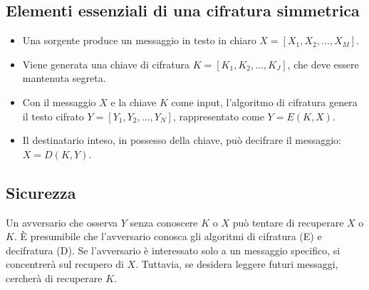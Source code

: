 \subsection{Elementi essenziali di una cifratura simmetrica}
\begin{itemize}
    \item Una sorgente produce un messaggio in testo in chiaro $X = [X_1, X_2, \ldots, X_M]$.
    \item Viene generata una chiave di cifratura $K = [K_1, K_2, \ldots, K_J]$, che deve essere mantenuta segreta.
    \item Con il messaggio $X$ e la chiave $K$ come input, l'algoritmo di cifratura genera 
    il testo cifrato $Y = [Y_1, Y_2, \ldots, Y_N]$, rappresentato come $Y = E(K, X)$.
    \item Il destinatario inteso, in possesso della chiave, può decifrare il messaggio: $X = D(K, Y)$.
\end{itemize}

\subsection{Sicurezza}
Un avversario che osserva $Y$ senza conoscere $K$ o $X$ può tentare di recuperare $X$ o $K$. 
È presumibile che l'avversario conosca gli algoritmi di cifratura (E) e decifratura (D).
Se l'avversario è interessato solo a un messaggio specifico, si concentrerà sul recupero
di $X$. Tuttavia, se desidera leggere futuri messaggi, cercherà di recuperare $K$.

